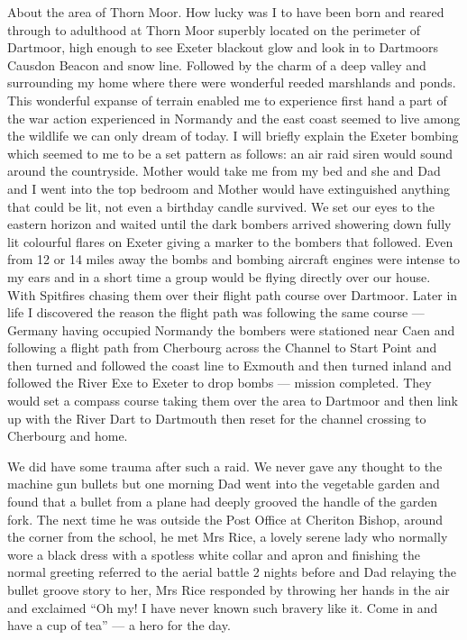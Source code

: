 About the area of Thorn Moor. How lucky was I to have been born and reared
through to adulthood at Thorn Moor superbly located on the perimeter of
Dartmoor, high enough to see Exeter blackout glow and look in to Dartmoors
Causdon Beacon and snow line. Followed by the charm of a deep valley and
surrounding my home where there were wonderful reeded marshlands and ponds.
This wonderful expanse of terrain enabled me to experience first hand a part of
the war action experienced in Normandy and the east coast seemed to live among
the wildlife we can only dream of today. I will briefly explain the Exeter
bombing which seemed to me to be a set pattern as follows: an air raid siren
would sound around the countryside. Mother would take me from my bed and she
and Dad and I went into the top bedroom and Mother would have extinguished
anything that could be lit, not even a birthday candle survived. We set our
eyes to the eastern horizon and waited until the dark bombers arrived showering
down fully lit colourful flares on Exeter giving a marker to the bombers that
followed. Even from 12 or 14 miles away the bombs and bombing aircraft engines
were intense to my ears and in a short time a group would be flying directly
over our house. With Spitfires chasing them over their flight path course over
Dartmoor. Later in life I discovered the reason the flight path was following
the same course --- Germany having occupied Normandy the bombers were stationed
near Caen and following a flight path from Cherbourg across the Channel to
Start Point and then turned and followed the coast line to Exmouth and then
turned inland and followed the River Exe to Exeter to drop bombs --- mission
completed. They would set a compass course taking them over the area to
Dartmoor and then link up with the River Dart to Dartmouth then reset for the
channel crossing to Cherbourg and home.

We did have some trauma after such a raid. We never gave any thought to the
machine gun bullets but one morning Dad went into the vegetable garden and
found that a bullet from a plane had deeply grooved the handle of the garden
fork. The next time he was outside the Post Office at Cheriton Bishop, around
the corner from the school, he met Mrs Rice, a lovely serene lady who normally
wore a black dress with a spotless white collar and apron and finishing the
normal greeting referred to the aerial battle 2 nights before and Dad relaying
the bullet groove story to her, Mrs Rice responded by throwing her hands in the
air and exclaimed ``Oh my! I have never known such bravery like it. Come in
and have a cup of tea'' --- a hero for the day.

